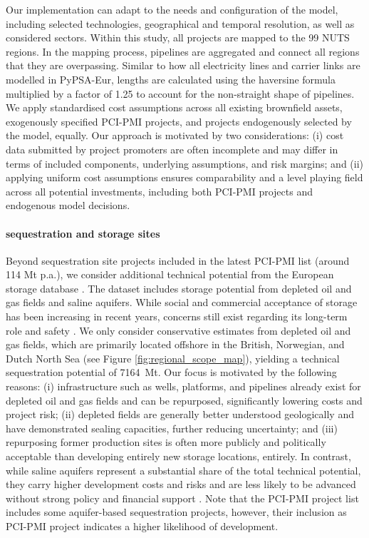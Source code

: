 \documentclass[preprint,12pt,sort&compress]{elsarticle}
\begin{document}
Our implementation can adapt to the needs and configuration of the model, including selected technologies, geographical and temporal resolution, as well as considered sectors. Within this study, all projects are mapped to the 99 NUTS regions. In the mapping process, pipelines are aggregated and connect all regions that they are overpassing. Similar to how all electricity lines and carrier links are modelled in PyPSA-Eur, lengths are calculated using the haversine formula multiplied by a factor of 1.25 to account for the non-straight shape of pipelines.
We apply standardised cost assumptions \cite{zeyenPyPSATechnologydataV01012025} across all existing brownfield assets, exogenously specified PCI-PMI projects, and projects endogenously selected by the model, equally. Our approach is motivated by two considerations: (i) cost data submitted by project promoters are often incomplete and may differ in terms of included components, underlying assumptions, and risk margins; and (ii) applying uniform cost assumptions ensures comparability and a level playing field across all potential investments, including both PCI-PMI projects and endogenous model decisions.

\paragraph{ sequestration and  storage sites}
\label{sec:co2_sequestration_sites}
Beyond  sequestration site projects included in the latest PCI-PMI list (around 114 Mt p.a.), we consider additional technical potential from the European  storage database \cite{europeancommissionEuropeanCO2Storage2020,hofmannH2CO2Network2025}. The dataset includes storage potential from depleted oil and gas fields and saline aquifers. While social and commercial acceptance of  storage has been increasing in recent years, concerns still exist regarding its long-term role and safety \cite{vanalphenSocietalAcceptanceCarbon2007}.
We only consider conservative estimates from depleted oil and gas fields, which are primarily located offshore in the British, Norwegian, and Dutch North Sea (see Figure \ref{fig:regional_scope_map}), yielding a technical sequestration potential of \SI{7164}{Mt}. Our focus is motivated by the following reasons: (i) infrastructure such as wells, platforms, and pipelines already exist for depleted oil and gas fields and can be repurposed, significantly lowering costs and project risk; (ii) depleted fields are generally better understood geologically and have demonstrated sealing capacities, further reducing uncertainty; and (iii) repurposing former production sites is often more publicly and politically acceptable than developing entirely new storage locations, entirely. In contrast, while saline aquifers represent a substantial share of the total technical potential, they carry higher development costs and risks and are less likely to be advanced without strong policy and financial support \cite{europeancommissionEuropeanCO2Storage2020}. Note that the PCI-PMI project list includes some aquifer-based sequestration projects, however, their inclusion as PCI-PMI project indicates a higher likelihood of development.
\end{document}
